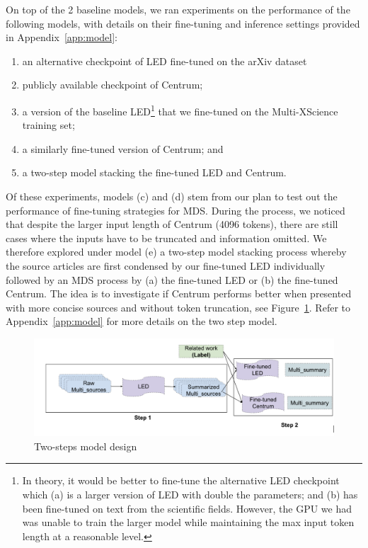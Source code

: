 \documentclass[12pt, twocolumn]{article}
\numberwithin{equation}{section}
\begin{document}
On top of the 2 baseline models, we ran experiments on the performance of the following models, with details on their fine-tuning and inference settings provided in Appendix~\ref{app:model}:

\begin{enumerate}
    \item an alternative checkpoint of LED fine-tuned on the arXiv dataset
    \item publicly available checkpoint of Centrum;
    \item a version of the baseline LED\footnote{In theory, it would be better to fine-tune the alternative LED checkpoint which (a) is a larger version of LED with double the parameters; and (b) has been fine-tuned on text from the scientific fields.  However, the GPU we had was unable to train the larger model while maintaining the max input token length at a reasonable level.} that we fine-tuned on the Multi-XScience training set; 
    \item a similarly fine-tuned version of Centrum; and
    \item a two-step model stacking the fine-tuned LED and Centrum.
\end{enumerate}

Of these experiments, models (c) and (d) stem from our plan to test out the performance of fine-tuning strategies for MDS.  During the process, we noticed that despite the larger input length of Centrum (4096 tokens), there are still cases where the inputs have to be truncated and information omitted.  We therefore explored under model (e) a two-step model stacking process whereby the source articles are first condensed by our fine-tuned LED individually followed by an MDS process by (a) the fine-tuned LED or (b) the fine-tuned Centrum.  The idea is to investigate if Centrum performs better when presented with more concise sources and without token truncation, see Figure~\ref{fig:two-steps}. Refer to Appendix~\ref{app:model} for more details on the two step model.

\begin{figure}
    \includegraphics[width=\columnwidth]{two_steps.png}
    \caption{Two-steps model design}
    \label{fig:two-steps}
\end{figure}
\end{document}
